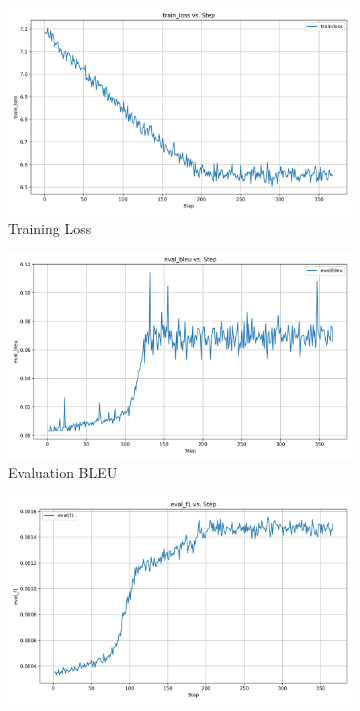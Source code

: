 \documentclass[12pt]{article}
\begin{document}
\begin{figure}[H]
	\centering
	\begin{subfigure}[b]{0.32\textwidth}
		\includegraphics[width=\linewidth]{Transformer_train_loss.png}
		\caption{Training Loss}
		\label{fig:train_loss}
	\end{subfigure}
	\hfill
	\begin{subfigure}[b]{0.32\textwidth}
		\includegraphics[width=\linewidth]{Transformer_eval_bleu.png}
		\caption{Evaluation BLEU}
		\label{fig:eval_bleu}
	\end{subfigure}
	\hfill
	\begin{subfigure}[b]{0.32\textwidth}
		\includegraphics[width=\linewidth]{Transformer_eval_f1.png}

\end{subfigure}
\end{figure}
\end{document}
